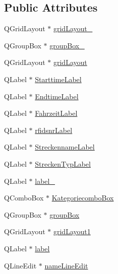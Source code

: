 \subsection*{Public Attributes}
\begin{CompactItemize}
\item 
QGridLayout $\ast$ \hyperlink{class_ui___r_f_i_d_input_dialog_class_62f0b3f50ee15202731a2f0bab9b5470}{gridLayout\_}
\item 
QGroupBox $\ast$ \hyperlink{class_ui___r_f_i_d_input_dialog_class_dc3b7fcb6dd3af1db8fafb18531f1dce}{groupBox\_}
\item 
QGridLayout $\ast$ \hyperlink{class_ui___r_f_i_d_input_dialog_class_fda092bbf06f3c0fb2f16aba03eb8d2d}{gridLayout}
\item 
QLabel $\ast$ \hyperlink{class_ui___r_f_i_d_input_dialog_class_fa81bfd32f474497e50bdc9a49603f94}{StarttimeLabel}
\item 
QLabel $\ast$ \hyperlink{class_ui___r_f_i_d_input_dialog_class_b8984751b020e9fa366f81334a159e9e}{EndtimeLabel}
\item 
QLabel $\ast$ \hyperlink{class_ui___r_f_i_d_input_dialog_class_0157542b72688ffeda45eb05d43e6e76}{FahrzeitLabel}
\item 
QLabel $\ast$ \hyperlink{class_ui___r_f_i_d_input_dialog_class_e1cf828e7765fc2de4958f12a5f20457}{rfidsnrLabel}
\item 
QLabel $\ast$ \hyperlink{class_ui___r_f_i_d_input_dialog_class_7b713247b88918a9e24f92b810e1c9d2}{StreckennameLabel}
\item 
QLabel $\ast$ \hyperlink{class_ui___r_f_i_d_input_dialog_class_1272a976363682dd34399d74b1fbd968}{StreckenTypLabel}
\item 
QLabel $\ast$ \hyperlink{class_ui___r_f_i_d_input_dialog_class_d894fc842438a63d08cda7a320266b2a}{label\_}
\item 
QComboBox $\ast$ \hyperlink{class_ui___r_f_i_d_input_dialog_class_5e8b3cf5f29c85c7592ca34fd56ec686}{KategoriecomboBox}
\item 
QGroupBox $\ast$ \hyperlink{class_ui___r_f_i_d_input_dialog_class_852715288c091652b9bae61a4890017f}{groupBox}
\item 
QGridLayout $\ast$ \hyperlink{class_ui___r_f_i_d_input_dialog_class_12b80532d37583f10c224daf1560a44e}{gridLayout1}
\item 
QLabel $\ast$ \hyperlink{class_ui___r_f_i_d_input_dialog_class_fe19f4f88155fcb3579718339d55c790}{label}
\item 
QLineEdit $\ast$ \hyperlink{class_ui___r_f_i_d_input_dialog_class_168853345738013708c4d46f3f3f84c0}{nameLineEdit}

\end{CompactItemize}
